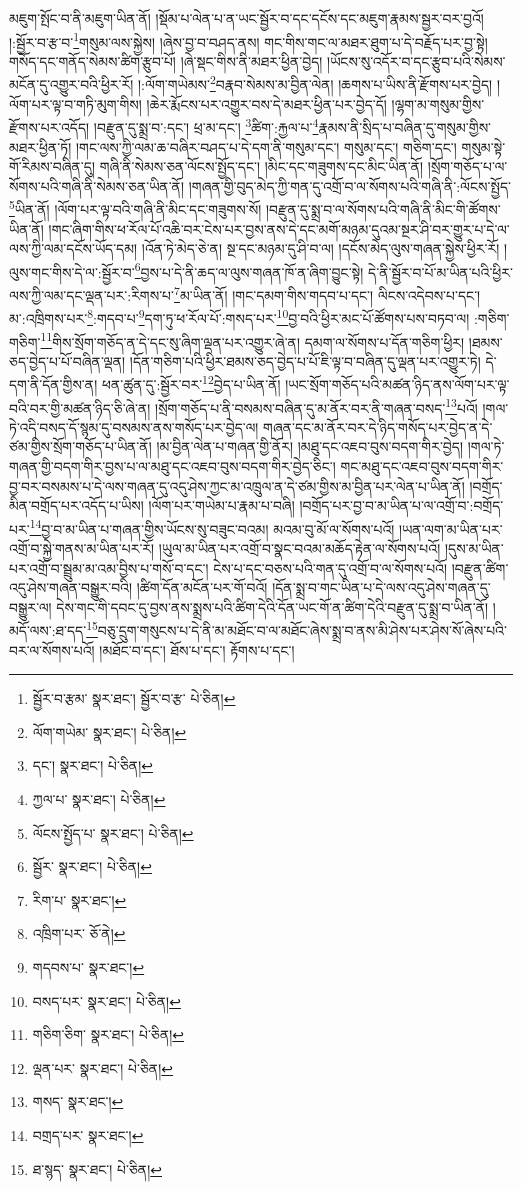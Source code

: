 མཇུག་སྤོང་བ་ནི་མཇུག་ཡིན་ནོ། །སྡོམ་པ་ལེན་པ་ན་ཡང་སྦྱོར་བ་དང་དངོས་དང་མཇུག་རྣམས་སྦྱར་བར་བྱའོ། །:སྦྱོར་བ་རྩ་བ་\footnote{སྦྱོར་བ་རྩམ་  སྣར་ཐང་། སྦྱོར་བ་རྩ་  པེ་ཅིན། }གསུམ་ལས་སྐྱེས། །ཞེས་བྱ་བ་བཤད་ནས། གང་གིས་གང་ལ་མཐར་ཐུག་པ་དེ་བརྗོད་པར་བྱ་སྟེ། གསོད་དང་གནོད་སེམས་ཚིག་རྩུབ་པོ། །ཞེ་སྡང་གིས་ནི་མཐར་ཕྱིན་བྱེད། །ཡོངས་སུ་འདོར་བ་དང་རྩུབ་པའི་སེམས་མངོན་དུ་འགྱུར་བའི་ཕྱིར་རོ། །:ལོག་གཡེམས་\footnote{ལོག་གཡེམ་  སྣར་ཐང་།  པེ་ཅིན། }བརྣབ་སེམས་མ་བྱིན་ལེན། །ཆགས་པ་ཡིས་ནི་རྫོགས་པར་བྱེད། །ལོག་པར་ལྟ་བ་གཏི་མུག་གིས། །ཆེར་རྨོངས་པར་འགྱུར་བས་དེ་མཐར་ཕྱིན་པར་བྱེད་དོ། །ལྷག་མ་གསུམ་གྱིས་རྫོགས་པར་འདོད། །བརྫུན་དུ་སྨྲ་བ་:དང་། ཕྲ་མ་དང་། \footnote{དང་།    སྣར་ཐང་།  པེ་ཅིན། }ཚིག་:རྐྱལ་པ་\footnote{ཀྱལ་པ་  སྣར་ཐང་།  པེ་ཅིན། }རྣམས་ནི་སྲིད་པ་བཞིན་དུ་གསུམ་གྱིས་མཐར་ཕྱིན་ཏོ། །གང་ལས་ཀྱི་ལམ་ཆ་བཞིར་བཤད་པ་དེ་དག་ནི་གསུམ་དང་། གསུམ་དང་། གཅིག་དང་། གསུམ་སྟེ་གོ་རིམས་བཞིན་དུ། གཞི་ནི་སེམས་ཅན་ལོངས་སྤྱོད་དང་། །མིང་དང་གཟུགས་དང་མིང་ཡིན་ནོ། །སྲོག་གཅོད་པ་ལ་སོགས་པའི་གཞི་ནི་སེམས་ཅན་ཡིན་ནོ། །གཞན་གྱི་བུད་མེད་ཀྱི་གན་དུ་འགྲོ་བ་ལ་སོགས་པའི་གཞི་ནི་:ལོངས་སྤྱོད་\footnote{ལོངས་སྤྱོད་པ་  སྣར་ཐང་།  པེ་ཅིན། }ཡིན་ནོ། །ལོག་པར་ལྟ་བའི་གཞི་ནི་མིང་དང་གཟུགས་སོ། །བརྫུན་དུ་སྨྲ་བ་ལ་སོགས་པའི་གཞི་ནི་མིང་གི་ཚོགས་ཡིན་ནོ། །གང་ཞིག་གིས་ཕ་རོལ་པོ་འཆི་བར་ངེས་པར་བྱས་ནས་དེ་དང་མགོ་མཉམ་དུའམ་སྔར་ཤི་བར་གྱུར་པ་དེ་ལ་ལས་ཀྱི་ལམ་དངོས་ཡོད་དམ། །འོན་ཏེ་མེད་ཅེ་ན། སྔ་དང་མཉམ་དུ་ཤི་བ་ལ། །དངོས་མེད་ལུས་གཞན་སྐྱེས་ཕྱིར་རོ། །ལུས་གང་གིས་དེ་ལ་:སྦྱོར་བ་\footnote{སྦྱོར་  སྣར་ཐང་།  པེ་ཅིན། }བྱས་པ་དེ་ནི་ཆད་ལ་ལུས་གཞན་ཁོ་ན་ཞིག་བྱུང་སྟེ། དེ་ནི་སྦྱོར་བ་པོ་མ་ཡིན་པའི་ཕྱིར་ལས་ཀྱི་ལམ་དང་ལྡན་པར་:རིགས་པ་\footnote{རིག་པ་  སྣར་ཐང་། }མ་ཡིན་ནོ། །གང་དམག་གིས་གདབ་པ་དང་། ལིངས་འདེབས་པ་དང་། མ་:འཁྲིགས་པར་\footnote{འཁྲིག་པར་  ཅོ་ནེ། }:གདབ་པ་\footnote{གདབས་པ་  སྣར་ཐང་། }དག་ཏུ་ཕ་རོལ་པོ་:གསད་པར་\footnote{བསད་པར་  སྣར་ཐང་།  པེ་ཅིན། }བྱ་བའི་ཕྱིར་མང་པོ་ཚོགས་པས་བཏབ་ལ། :གཅིག་གཅིག་\footnote{གཅིག་ཅིག་  སྣར་ཐང་།  པེ་ཅིན། }གིས་སྲོག་གཅོད་ན་དེ་དང་སུ་ཞིག་ལྡན་པར་འགྱུར་ཞེ་ན། དམག་ལ་སོགས་པ་དོན་གཅིག་ཕྱིར། །ཐམས་ཅད་བྱེད་པ་པོ་བཞིན་ལྡན། །དོན་གཅིག་པའི་ཕྱིར་ཐམས་ཅད་བྱེད་པ་པོ་ཇི་ལྟ་བ་བཞིན་དུ་ལྡན་པར་འགྱུར་ཏེ། དེ་དག་ནི་དོན་གྱིས་ན། ཕན་ཚུན་དུ་:སྦྱོར་བར་\footnote{ལྡན་པར་  སྣར་ཐང་།  པེ་ཅིན། }བྱེད་པ་ཡིན་ནོ། །ཡང་སྲོག་གཅོད་པའི་མཚན་ཉིད་ནས་ལོག་པར་ལྟ་བའི་བར་གྱི་མཚན་ཉིད་ཅི་ཞེ་ན། །སྲོག་གཅོད་པ་ནི་བསམས་བཞིན་དུ་མ་ནོར་བར་ནི་གཞན་བསད་\footnote{གསད་  སྣར་ཐང་། }པའོ། །གལ་ཏེ་འདི་བསད་དོ་སྙམ་དུ་བསམས་ནས་གསོད་པར་བྱེད་ལ། གཞན་དང་མ་ནོར་བར་དེ་ཉིད་གསོད་པར་བྱེད་ན་དེ་ཙམ་གྱིས་སྲོག་གཅོད་པ་ཡིན་ནོ། །མ་བྱིན་ལེན་པ་གཞན་གྱི་ནོར། །མཐུ་དང་འཇབ་བུས་བདག་གིར་བྱེད། །གལ་ཏེ་གཞན་གྱི་བདག་གིར་བྱས་པ་ལ་མཐུ་དང་འཇབ་བུས་བདག་གིར་བྱེད་ཅིང་། གང་མཐུ་དང་འཇབ་བུས་བདག་གིར་བྱ་བར་བསམས་པ་དེ་ལས་གཞན་དུ་འདུ་ཤེས་ཀྱང་མ་འཁྲུལ་ན་དེ་ཙམ་གྱིས་མ་བྱིན་པར་ལེན་པ་ཡིན་ནོ། །བགྲོད་མིན་བགྲོད་པར་འདོད་པ་ཡིས། །ལོག་པར་གཡེམ་པ་རྣམ་པ་བཞི། །བགྲོད་པར་བྱ་བ་མ་ཡིན་པ་ལ་འགྲོ་བ་:བགྲོད་པར་\footnote{བགྲད་པར་  སྣར་ཐང་། }བྱ་བ་མ་ཡིན་པ་གཞན་གྱིས་ཡོངས་སུ་བཟུང་བའམ། མའམ་བུ་མོ་ལ་སོགས་པའོ། །ཡན་ལག་མ་ཡིན་པར་འགྲོ་བ་སྐྱེ་གནས་མ་ཡིན་པར་རོ། །ཡུལ་མ་ཡིན་པར་འགྲོ་བ་སྣང་བའམ་མཆོད་རྟེན་ལ་སོགས་པའོ། །དུས་མ་ཡིན་པར་འགྲོ་བ་སྦྲུམ་མ་འམ་བྱིས་པ་གསོ་བ་དང་། ངེས་པ་དང་བཅས་པའི་གན་དུ་འགྲོ་བ་ལ་སོགས་པའོ། །བརྫུན་ཚིག་འདུ་ཤེས་གཞན་བསྒྱུར་བའི། །ཚིག་དོན་མངོན་པར་གོ་བའོ། །དོན་སྨྲ་བ་གང་ཡིན་པ་དེ་ལས་འདུ་ཤེས་གཞན་དུ་བསྒྱུར་ལ། དེས་གང་གི་དབང་དུ་བྱས་ནས་སྨྲས་པའི་ཚིག་དེའི་དོན་ཡང་གོ་ན་ཚིག་དེའི་བརྫུན་དུ་སྨྲ་བ་ཡིན་ནོ། །མདོ་ལས་:ཐ་དད་\footnote{ཐ་སྙད་  སྣར་ཐང་།  པེ་ཅིན། }བཅུ་དྲུག་གསུངས་པ་དེ་ནི་མ་མཐོང་བ་ལ་མཐོང་ཞེས་སྨྲ་བ་ནས་མི་ཤེས་པར་ཤེས་སོ་ཞེས་པའི་བར་ལ་སོགས་པའོ། །མཐོང་བ་དང་། ཐོས་པ་དང་། རྟོགས་པ་དང་། 